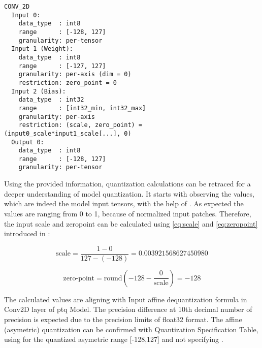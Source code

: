 {\begin{verbatim}
CONV_2D
  Input 0:
    data_type  : int8
    range      : [-128, 127]
    granularity: per-tensor
  Input 1 (Weight):
    data_type  : int8
    range      : [-127, 127]
    granularity: per-axis (dim = 0)
    restriction: zero_point = 0
  Input 2 (Bias):
    data_type  : int32
    range      : [int32_min, int32_max]
    granularity: per-axis
    restriction: (scale, zero_point) = (input0_scale*input1_scale[...], 0)
  Output 0:
    data_type  : int8
    range      : [-128, 127]
    granularity: per-tensor
\end{verbatim}

Using the provided information, quantization calculations can be retraced for a deeper understanding of model quantization.
It starts with observing the  values, which are indeed the model input tensors, with the help of .
As expected the values are ranging from 0 to 1, because of normalized input patches. Therefore,
the input scale and zeropoint can be calculated using \ref{eq:scale} and \ref{eq:zeropoint} introduced in :

\begin{equation*}
\text{scale} = \frac{1 - 0}{127 - (-128)} = 0.003921568627450980
\end{equation*}

\begin{equation*}
\text{zero-point} = \text{round}\left( -128 - \frac{0}{\text{scale}} \right) = -128
\end{equation*}

The calculated values are aligning with Input affine dequantization formula in Conv2D layer of \gls{ptq} Model.
The precision difference at 10th decimal number of precision is expected due to the precision limits of \gls{float32} format.
The affine (asymetric) quantization can be confirmed with Quantization Specification Table,
using for  the quantized asymetric range [-128,127] and not specifying .

}
